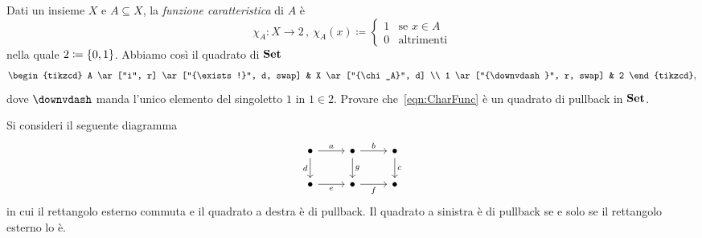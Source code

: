 \begin{esercizio}
Dati un insieme \(X\) e \(A \subseteq X\), la {\em funzione caratteristica} di \(A\) è
\[\chi_A : X \to 2\,, \ \chi_A(x) \coloneq \begin{cases}1 & \text{se } x \in A \\ 0 & \text{altrimenti}\end{cases}\]
nella quale \(2 \coloneq \left\{0, 1\right\}\). Abbiamo così il quadrato di \(\mathbf{Set}\)
\begin{equation}\begin{tikzcd}
A \ar["i", r] \ar["{\exists!}", d, swap] & X \ar["{\chi_A}", d] \\
1 \ar["{\downvdash}", r, swap]           & 2
\end{tikzcd},\label{eqn:CharFunc}\end{equation}
dove \(\downvdash\) manda l'unico elemento del singoletto \(1\) in \(1 \in 2\). Provare che~\eqref{eqn:CharFunc} è un quadrato di pullback in \(\mathbf{Set}\).
\end{esercizio}

\begin{teorema}\label{teorema:PBL}
Si consideri il seguente diagramma
\[\begin{tikzcd}
\bullet \ar["a", r] \ar["d", d, swap] & \bullet \ar["b", r] \ar["g", d] & \bullet \ar["c", d]\\
\bullet \ar["e", r, swap] & \bullet \ar["f", r, swap] & \bullet
\end{tikzcd}\]
in cui il rettangolo esterno commuta e il quadrato a destra è di pullback. Il quadrato a sinistra è di pullback se e solo se il rettangolo esterno lo è.
\end{teorema}

